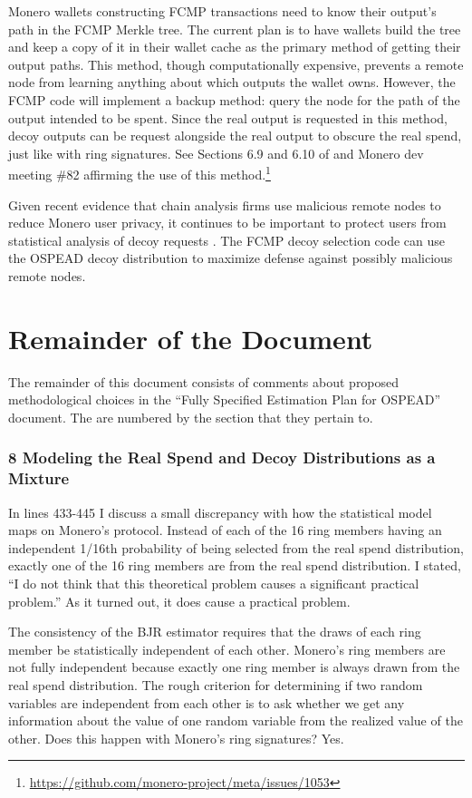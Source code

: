 \documentclass[english]{article}
\begin{document}
Monero wallets constructing FCMP transactions need to know their output's
path in the FCMP Merkle tree. The current plan is to have wallets
build the tree and keep a copy of it in their wallet cache as the
primary method of getting their output paths. This method, though
computationally expensive, prevents a remote node from learning anything
about which outputs the wallet owns. However, the FCMP code will implement
a backup method: query the node for the path of the output intended
to be spent. Since the real output is requested in this method, decoy
outputs can be request alongside the real output to obscure the real
spend, just like with ring signatures. See Sections 6.9 and 6.10 of
\cite{Parker2024} and Monero dev meeting \#82 affirming the use of
this method.\footnote{\href{https://github.com/monero-project/meta/issues/1053}{https://github.com/monero-project/meta/issues/1053}}

Given recent evidence that chain analysis firms use malicious remote
nodes to reduce Monero user privacy, it continues to be important
to protect users from statistical analysis of decoy requests \cite{Kuyucu2024}.
The FCMP decoy selection code can use the OSPEAD decoy distribution
to maximize defense against possibly malicious remote nodes.

\section*{Remainder of the Document}

The remainder of this document consists of comments about proposed
methodological choices in the ``Fully Specified Estimation Plan for
OSPEAD'' document. The are numbered by the section that they pertain
to.

\subsubsection*{8 Modeling the Real Spend and Decoy Distributions as a Mixture}

In lines 433-445 I discuss a small discrepancy with how the statistical
model maps on Monero's protocol. Instead of each of the 16 ring members
having an independent 1/16th probability of being selected from the
real spend distribution, exactly one of the 16 ring members are from
the real spend distribution. I stated, ``I do not think that this
theoretical problem causes a significant practical problem.'' As
it turned out, it does cause a practical problem.

The consistency of the BJR estimator requires that the draws of each
ring member be statistically independent of each other. Monero's ring
members are not fully independent because exactly one ring member
is always drawn from the real spend distribution. The rough criterion
for determining if two random variables are independent from each
other is to ask whether we get any information about the value of
one random variable from the realized value of the other. Does this
happen with Monero's ring signatures? Yes.
\end{document}
